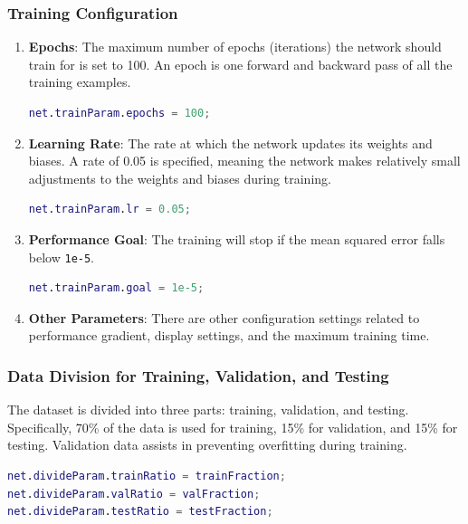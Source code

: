 \subsubsection{Training Configuration}
\begin{enumerate}
    \item \textbf{Epochs}: The maximum number of epochs (iterations) the network should train for is set to 100. An epoch is one forward and backward pass of all the training examples.

    \begin{lstlisting}[language=Matlab]
    net.trainParam.epochs = 100;
    \end{lstlisting}

    \item \textbf{Learning Rate}: The rate at which the network updates its weights and biases. A rate of 0.05 is specified, meaning the network makes relatively small adjustments to the weights and biases during training.

    \begin{lstlisting}[language=Matlab]
    net.trainParam.lr = 0.05;
    \end{lstlisting}

    \item \textbf{Performance Goal}: The training will stop if the mean squared error falls below \texttt{1e-5}.

    \begin{lstlisting}[language=Matlab]
    net.trainParam.goal = 1e-5;
    \end{lstlisting}
    
    \item \textbf{Other Parameters}: There are other configuration settings related to performance gradient, display settings, and the maximum training time.
\end{enumerate}

\subsubsection{Data Division for Training, Validation, and Testing}

The dataset is divided into three parts: training, validation, and testing. Specifically, 70\% of the data is used for training, 15\% for validation, and 15\% for testing. Validation data assists in preventing overfitting during training.

\begin{lstlisting}[language=Matlab]
net.divideParam.trainRatio = trainFraction;
net.divideParam.valRatio = valFraction;
net.divideParam.testRatio = testFraction;
\end{lstlisting}


